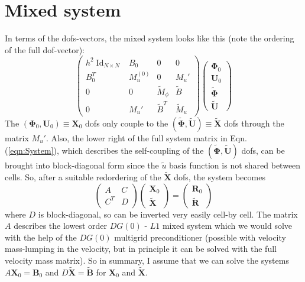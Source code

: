 \documentclass[12pt]{article}
\renewcommand{\vec}[1]{\boldsymbol{#1}}
\newcommand{\Id}{\operatorname{Id}}
\begin{document}
\section{Mixed system}
In terms of the dofs-vectors, the mixed system looks like this (note the ordering of the full dof-vector):
\begin{equation}
\begin{pmatrix}
  h^2\Id_{N\times N} & B_0 & 0 & 0 \\
  B_0^T & M_u^{(0)} & 0 & M_u' \\
   0 & 0 & \tilde{M}_\phi & \tilde{B} \\
   0 & M_u' & \tilde{B}^T & \tilde{M}_u
\end{pmatrix}
\begin{pmatrix}
  \vec{\Phi}_0 \\
  \vec{U}_0 \\
  \tilde{\vec{\Phi}} \\
  \tilde{\vec{U}}
\end{pmatrix}
\label{eqn:System}
\end{equation}
The $(\vec{\Phi}_0,\vec{U}_0)\equiv \vec{X}_0$ dofs only couple to the $(\tilde{\vec{\Phi}},\tilde{\vec{U}})\equiv \tilde{\vec{X}}$ dofs through the matrix $M_u'$. Also, the lower right of the full system matrix in Eqn. (\ref{eqn:System}), which describes the self-coupling of the $(\tilde{\vec{\Phi}},\tilde{\vec{U}})$ dofs, can be brought into block-diagonal form since the $\tilde{u}$ basis function is not shared between cells. So, after a suitable redordering of the $\tilde{\vec{X}}$ dofs, the system becomes
\begin{equation}
\begin{pmatrix}
A & C \\
C^T & D  
\end{pmatrix}
\begin{pmatrix}
\vec{X}_0 \\
\tilde{\vec{X}}
\end{pmatrix}
=
\begin{pmatrix}
\vec{R}_0 \\
\tilde{\vec{R}}
\end{pmatrix}
\label{eqn:finalSystem}
\end{equation}
where $D$ is block-diagonal, so can be inverted very easily cell-by cell. The matrix $A$ describes the lowest order $DG(0)$ - $L1$ mixed system which we would solve with the help of the $DG(0)$ multigrid preconditioner (possible with velocity mass-lumping in the velocity, but in principle it can be solved with the full velocity mass matrix). So in summary, I assume that we can solve the systems $A\vec{X}_0 = \vec{B}_0$ and $D\tilde{\vec{X}} = \tilde{\vec{B}}$ for $\vec{X}_0$ and $\tilde{\vec{X}}$.
\end{document}
